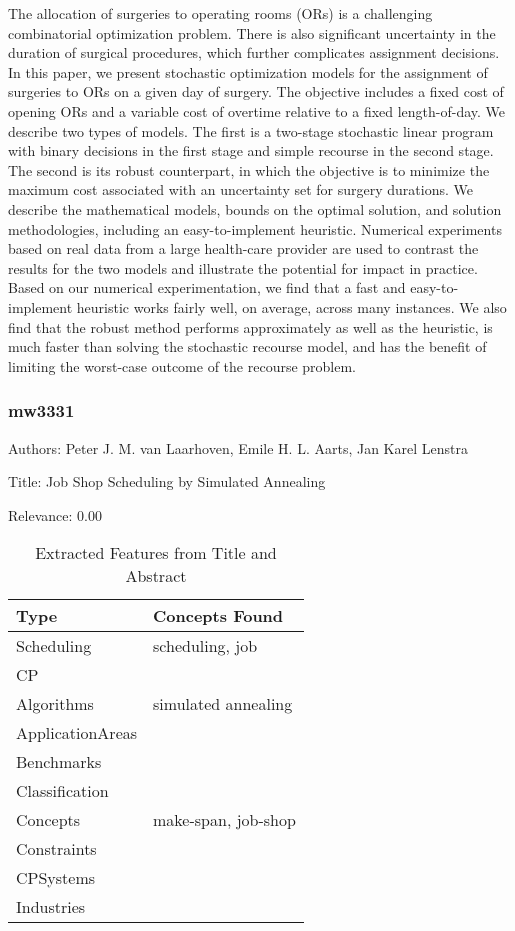   The allocation of surgeries to operating rooms (ORs) is a challenging combinatorial optimization problem. There is also significant uncertainty in the duration of surgical procedures, which further complicates assignment decisions. In this paper, we present stochastic optimization models for the assignment of surgeries to ORs on a given day of surgery. The objective includes a fixed cost of opening ORs and a variable cost of overtime relative to a fixed length-of-day. We describe two types of models. The first is a two-stage stochastic linear program with binary decisions in the first stage and simple recourse in the second stage. The second is its robust counterpart, in which the objective is to minimize the maximum cost associated with an uncertainty set for surgery durations. We describe the mathematical models, bounds on the optimal solution, and solution methodologies, including an easy-to-implement heuristic. Numerical experiments based on real data from a large health-care provider are used to contrast the results for the two models and illustrate the potential for impact in practice. Based on our numerical experimentation, we find that a fast and easy-to-implement heuristic works fairly well, on average, across many instances. We also find that the robust method performs approximately as well as the heuristic, is much faster than solving the stochastic recourse model, and has the benefit of limiting the worst-case outcome of the recourse problem.  

\subsubsection{mw3331}
\label{mw:mw3331}

Authors: Peter J. M. van Laarhoven, Emile H. L. Aarts, Jan Karel Lenstra

Title: Job Shop Scheduling by Simulated Annealing

Relevance:  0.00

{\scriptsize
\begin{longtable}{p{2cm}p{20cm}}
\caption{Extracted Features from Title and Abstract}\\ \toprule
Type & Concepts Found\\ \midrule
\endhead
\bottomrule
\endfoot
Scheduling & scheduling, job\\ 
CP & \\ 
Algorithms & simulated annealing\\ 
ApplicationAreas & \\ 
Benchmarks & \\ 
Classification & \\ 
Concepts & make-span, job-shop\\ 
Constraints & \\ 
CPSystems & \\ 
Industries & \\ 
\end{longtable}
}

